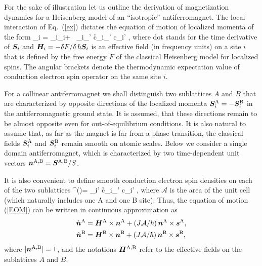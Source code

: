 For the sake of illustration let us outline the derivation of magnetization dynamics for a Heisenberg model of an ``isotropic'' antiferromagnet. The local interaction of Eq.~(\ref{ex}) dictates the equation of motion of localized momenta of the form
\be
\label{EOM}
_i = _i\times {}_i+ \, _i\times \s_{\sigma\sigma'} \lt\la c\h_{i\sigma}\bb{\sigma}_{\sigma\sigma'} c\0_{i\sigma'} \rt\ra,
\e
where dot stands for the time derivative of $\boldsymbol{S}_i$ and $\boldsymbol{H}_i=-\delta F/ \delta\, \hbar\boldsymbol{S}_i$ is an effective field (in frequency units) on a site $i$  that is defined by the free energy $F$ of the classical Heisenberg model for localized spins. The angular brackets denote the thermodynamic expectation value of conduction electron spin operator on the same site $i$. 

For a collinear antiferromagnet we shall distinguish two sublattices $A$ and $B$ that are characterized by opposite directions of the localized momenta $\boldsymbol{S}_i^\text{A}=-\boldsymbol{S}_i^\text{B}$ in the antiferromagnetic ground state. It is assumed, that these directions remain to be almost opposite even for out-of-equilibrium conditions. It is also natural to assume that, as far as the magnet is far from a phase transition, the classical fields $\boldsymbol{S}_i^\text{A}$ and $\boldsymbol{S}_i^\text{B}$ remain smooth on atomic scales. Below we consider a single domain antiferromagnet, which is characterized by two time-dependent unit vectors $\boldsymbol{n}^\text{A,B}=\boldsymbol{S}^\text{A,B}/S$. 

It is also convenient to define smooth conduction electron spin densities on each of the two sublattices
\be
{}^()=  \s_{i\sigma\sigma'} \lt\la c\h_{i\sigma}\bb{\sigma}_{\sigma\sigma'} c\0_{i\sigma'} \rt\ra\;,
\e
where $\mathcal{A}$ is the area of the unit cell (which naturally includes one A and one B site). Thus, the equation of motion (\ref{EOM}) can be written in  continuous approximation as
\beml
\label{EOMAFM}
\begin{align}
\dot{\boldsymbol{n}}^\text{A} &= \boldsymbol{H}^\text{A}\times \boldsymbol{n}^\text{A}+ (J\mathcal{A}/\hbar)\, \boldsymbol{n}^\text{A}\times \boldsymbol{s}^\text{A},\\
\dot{\boldsymbol{n}}^\text{B}&= \boldsymbol{H}^\text{B}\times \boldsymbol{n}^\text{B}+ (J\mathcal{A}/\hbar)\, \boldsymbol{n}^\text{B}\times \boldsymbol{s}^\text{B},
\end{align}
\eml
where $|\boldsymbol{n}^\text{A,B}|=1$, and the notations $\boldsymbol{H}^\text{A,B}$ refer to the effective fields on the sublattices $A$ and $B$. 


